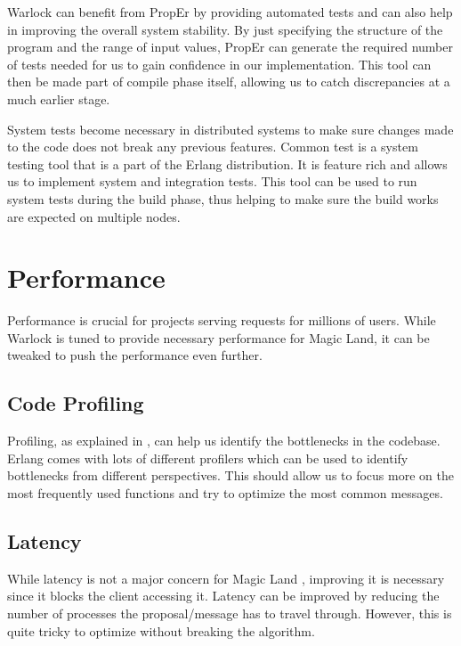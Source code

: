 Warlock can benefit from PropEr%
by providing automated tests and can also help in improving the overall
system stability. By just specifying the structure of the program and the range
of input values, PropEr can generate the required number of tests needed for
us to gain confidence in our implementation. This tool can then be made
part of compile phase itself, allowing us to catch discrepancies at a much
earlier stage.

System tests%
become necessary in distributed systems to make sure changes made to the code
does not break any previous features. Common test \citep{common.test} is a
system testing tool that is a part of the Erlang distribution. It is feature
rich and allows us to implement system and integration tests. This tool can
be used to run system tests during the build phase, thus helping to make sure
the build works are expected on multiple nodes.

\section{Performance}

Performance is crucial for projects serving requests for millions of users.
While Warlock is tuned to provide necessary performance for Magic Land, it
can be tweaked to push the performance even further.

\subsection{Code Profiling}

Profiling, as explained in , can help us identify the
bottlenecks in the codebase. Erlang comes with lots of different profilers
which can be used to identify bottlenecks from different perspectives. This
should allow us to focus more on the most frequently used functions and try
to optimize the most common messages.

\subsection{Latency}

While latency is not a major concern for Magic Land%
, improving it is necessary since it blocks the client accessing it. Latency
can be improved by reducing the number of processes the proposal/message has
to travel through. However, this is quite tricky to optimize without breaking
the algorithm.

